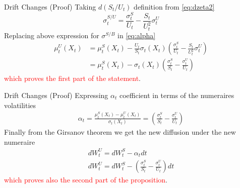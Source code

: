 \documentclass{beamer}
\begin{document}
\begin{frame}{Drift Changes (Proof)}   
	Taking $d(S_t/U_t)$ definition from \cref{eq:dzeta2}
	\begin{equation}
	\sigma_t^{S/U} = \frac{\sigma^S_t}{U_t} - \frac{S_t}{U^2_t}\sigma^U_t
	\end{equation}
	Replacing above expression for $\sigma^{S/B}$ in \cref{eq:alpha}
	\begin{equation}
		\begin{aligned}
			\mu_t^U(X_t)&=\mu_t^S(X_t)-\frac{U_t}{S_t}\sigma_t(X_t)\left(\frac{\sigma^S_t}{U_t} - \frac{S_t}{U^2_t}\sigma^U_t\right)\\
			&=\mu_t^S(X_t)-\sigma_t(X_t)\left(\frac{\sigma^S_t}{S_t} - \frac{\sigma^U_t}{U_t}\right)
		\end{aligned}
	\end{equation}
	\textcolor{red}{which proves the first part of the statement}.
\end{frame}

\begin{frame}{Drift Changes (Proof)}
	Expressing $\alpha_t$ coefficient in terms of the numeraires volatilities
	\begin{equation}
	\begin{aligned}
		\alpha_t = \frac{\mu_t^S(X_t) - \mu_t^U(X_t)}{\sigma_t(X_t)} = \left(\frac{\sigma^S_t}{S_t} - \frac{\sigma^U_t}{U_t}\right)
	\end{aligned}
	\end{equation}
	Finally from the Girsanov theorem we get the new diffusion under the new numeraire
	\begin{equation}
		\begin{gathered}
		dW^U_t = dW^S_t - \alpha_t dt \\
		dW^U_t = dW^S_t - \left(\frac{\sigma^S_t}{S_t}-\frac{\sigma^U_t}{U_t}\right) dt
		\end{gathered}
	\end{equation}
	\textcolor{red}{which proves also the second part of the proposition}.
	
\end{frame}
\end{document}
